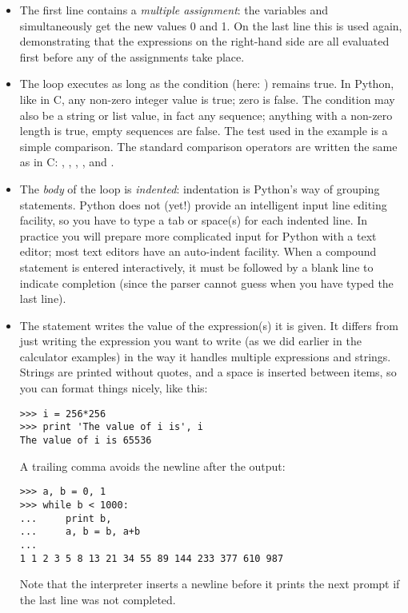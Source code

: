\documentclass{manual}
\begin{document}
\begin{itemize}

\item
The first line contains a \emph{multiple assignment}: the variables
 and  simultaneously get the new values 0 and 1.  On the
last line this is used again, demonstrating that the expressions on
the right-hand side are all evaluated first before any of the
assignments take place.

\item
The  loop executes as long as the condition (here:
) remains true.  In Python, like in C, any non-zero
integer value is true; zero is false.  The condition may also be a
string or list value, in fact any sequence; anything with a non-zero
length is true, empty sequences are false.  The test used in the
example is a simple comparison.  The standard comparison operators are
written the same as in C: \code{<}, \code{>}, \code{==}, \code{<=},
\code{>=} and \code{!=}.

\item
The \emph{body} of the loop is \emph{indented}: indentation is Python's
way of grouping statements.  Python does not (yet!) provide an
intelligent input line editing facility, so you have to type a tab or
space(s) for each indented line.  In practice you will prepare more
complicated input for Python with a text editor; most text editors have
an auto-indent facility.  When a compound statement is entered
interactively, it must be followed by a blank line to indicate
completion (since the parser cannot guess when you have typed the last
line).

\item
The  statement writes the value of the expression(s) it is
given.  It differs from just writing the expression you want to write
(as we did earlier in the calculator examples) in the way it handles
multiple expressions and strings.  Strings are printed without quotes,
and a space is inserted between items, so you can format things nicely,
like this:

\begin{verbatim}
>>> i = 256*256
>>> print 'The value of i is', i
The value of i is 65536
\end{verbatim}

A trailing comma avoids the newline after the output:

\begin{verbatim}
>>> a, b = 0, 1
>>> while b < 1000:
...     print b,
...     a, b = b, a+b
... 
1 1 2 3 5 8 13 21 34 55 89 144 233 377 610 987
\end{verbatim}

Note that the interpreter inserts a newline before it prints the next
prompt if the last line was not completed.

\end{itemize}
\end{document}
